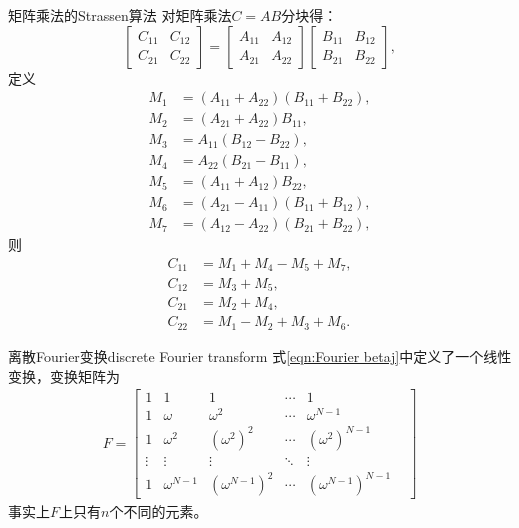 \begin{theorem}
    {矩阵乘法的Strassen算法}{}
    对矩阵乘法$C=AB$分块得：
    \[
        \begin{bmatrix}
            C_{11}&C_{12}\\
            C_{21}&C_{22}
        \end{bmatrix}=\begin{bmatrix}
            A_{11}&A_{12}\\
            A_{21}&A_{22}
        \end{bmatrix}\begin{bmatrix}
            B_{11}&B_{12}\\
            B_{21}&B_{22}
        \end{bmatrix},
    \]
    定义 
    \begin{subequations}
        \begin{align}
            M_1&=(A_{11}+A_{22})(B_{11}+B_{22}),\\
            M_2&=(A_{21}+A_{22})B_{11},\\
            M_3&=A_{11}(B_{12}-B_{22}),\\
            M_4&=A_{22}(B_{21}-B_{11}),\\
            M_5&=(A_{11}+A_{12})B_{22},\\
            M_6&=(A_{21}-A_{11})(B_{11}+B_{12}),\\
            M_7&=(A_{12}-A_{22})(B_{21}+B_{22}),
        \end{align}
    \end{subequations}
    则
    \begin{subequations}
        \begin{align}
            C_{11}&=M_1+M_4-M_5+M_7,\\
            C_{12}&=M_3+M_5,\\
            C_{21}&=M_2+M_4,\\
            C_{22}&=M_1-M_2+M_3+M_6.
        \end{align}
    \end{subequations}
\end{theorem}

\begin{definition}
    {离散Fourier变换}{discrete Fourier transform}
    式\eqref{eqn:Fourier betaj}中定义了一个线性变换，变换矩阵为
    \begin{eqnarray}
        F=\begin{bmatrix}
            1&1&1&\cdots&1\\
            1&\omega&\omega^2&\cdots&\omega^{N-1}\\
            1&\omega^2&(\omega^2)^2&\cdots&(\omega^2)^{N-1}\\
            \vdots&\vdots&\vdots&\ddots&\vdots&\\
            1&\omega^{N-1}&(\omega^{N-1})^2&\cdots&(\omega^{N-1})^{N-1}
        \end{bmatrix}
    \end{eqnarray}
    事实上$F$上只有$n$个不同的元素。
\end{definition}
